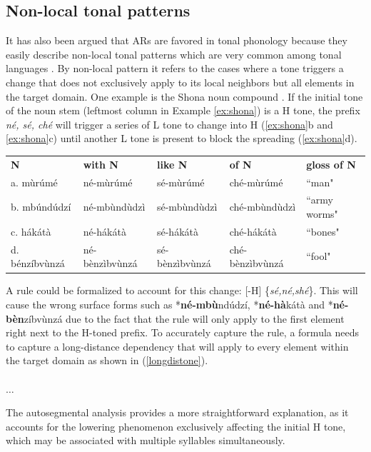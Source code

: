 \documentclass[11pt,letterpaper]{article}
\begin{document}
\subsection{Non-local tonal patterns}
It has also been argued that ARs are favored in tonal phonology because they easily describe non-local tonal patterns which are very common among tonal languages \citep{oddenbook}. By non-local pattern it refers to the cases where a tone triggers a change that does not exclusively apply to its local neighbors but all elements in the target domain. One example is the Shona noun compound \citep{odden1994adjacency}. If the initial tone of the noun stem (leftmost column in Example \ref{ex:shona}) is a H tone, the prefix \textit{né, sé, ché} will trigger a series of L tone to change into H (\ref{ex:shona}b and \ref{ex:shona}c) until another L tone is present to block the spreading (\ref{ex:shona}d). 


\ea \label{ex:shona}
\begin{tabular}{lllll}
\textbf{N}     & \textbf{with N} & \textbf{like N} & \textbf{of N}   &  \textbf{gloss of N}           \\
a. mùrúmé      & né-mùrúmé       & sé-mùrúmé       & ché-mùrúmé      & ``man"        \\
b. mbúndúdzí   & né-mbùndùdzì    & sé-mbùndùdzì    & ché-mbùndùdzì   & ``army worms" \\
c. hákátà      & né-hákátà       & sé-hákátà       & ché-hákátà      & ``bones"      \\
d. bénzíbvùnzá & né-bènzìbvùnzá  & sé-bènzìbvùnzá  & ché-bènzìbvùnzá & ``fool"
\end{tabular}
\z

A rule could be formalized to account for this change: \phonl{[+H] } {[-H]} {\{\textit{sé,né,shé}\}}. This will cause the wrong surface forms such as *\textbf{né-mbù}ndúdzí,  *\textbf{né-hà}kátà and *\textbf{né-bèn}zíbvùnzá due to the fact that the rule will only apply to the first element right next to the H-toned prefix. To accurately capture the rule, a formula needs to capture a long-distance dependency that will apply to every element within the target domain as shown in (\ref{longdistone}).
\ea \label{longdistone}
\\
\\
$\ldots$\\
\z

The autosegmental analysis provides a more straightforward explanation, as it accounts for the lowering phenomenon exclusively affecting the initial H tone, which may be associated with multiple syllables simultaneously. 
\end{document}
